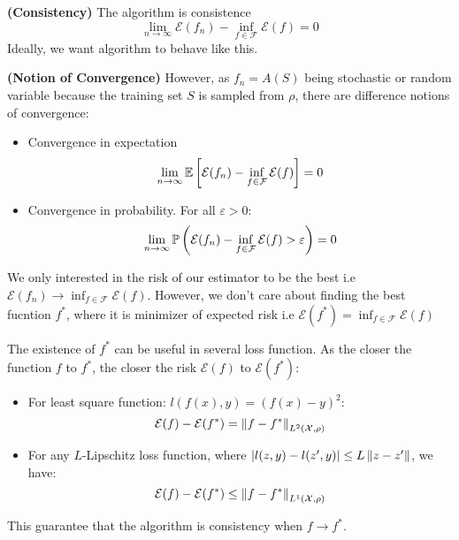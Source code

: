 \begin{definition}{\textbf{(Consistency)}}
    The algorithm is consistence
    \begin{equation*}
        \lim_{n\rightarrow\infty} \mathcal{E}(f_n) - \inf_{f\in\mathcal{F}}\mathcal{E}(f) = 0
    \end{equation*}
    Ideally, we want algorithm to behave like this.
\end{definition}

\begin{definition}{\textbf{(Notion of Convergence)}}
    However, as $f_n=A(S)$ being stochastic or random variable because the training set $S$ is sampled from $\rho$, there are difference notions of convergence:
    \begin{itemize}
        \item Convergence in expectation
        \begin{equation*}
            \lim_{n\rightarrow\infty}\mathbb{E}\left[ \mathcal{E}(f_n) - \inf_{f\in\mathcal{F}} \mathcal{E}(f)  \right] = 0
        \end{equation*}
        \item Convergence in probability. For all $\varepsilon>0$:
        \begin{equation*}
            \lim_{n\rightarrow\infty}\mathbb{P}\left( \mathcal{E}(f_n) - \inf_{f\in\mathcal{F}} \mathcal{E}(f) > \varepsilon  \right) = 0
        \end{equation*}
    \end{itemize}
\end{definition}

\begin{remark}
    We only interested in the risk of our estimator to be the best i.e $\mathcal{E}(f_n) \rightarrow \inf_{f\in\mathcal{F}}\mathcal{E}(f)$. However, we don't care about finding the best fucntion $f^*$, where it is minimizer of expected risk i.e $\mathcal{E}(f^*) = \inf_{f\in\mathcal{F}}\mathcal{E}(f)$
\end{remark}

\begin{remark}
    The existence of $f^*$ can be useful in several loss function. As the closer the function $f$ to $f^*$, the closer the risk $ \mathcal{E}(f) $ to $\mathcal{E}(f^*)$: 
    \begin{itemize}
        \item For least square function: $l(f(x), y) = (f(x)-y)^2$:
        \begin{equation*}
            \mathcal{E}(f) - \mathcal{E}(f^*) = \left\lVert f-f^*\right\rVert_{L^2(\mathcal{X}, \rho)}
        \end{equation*}
        \item For any $L$-Lipschitz loss function, where $\left| l(z, y)-l(z', y) \right|\le L\left\lVert z-z'\right\rVert$, we have:
        \begin{equation*}
            \mathcal{E}(f) - \mathcal{E}(f^*) \le \left\lVert f-f^*\right\rVert_{L^1(\mathcal{X}, \rho)}
        \end{equation*}
    \end{itemize}
    This guarantee that the algorithm is consistency when $f\rightarrow f^*$.
\end{remark}

